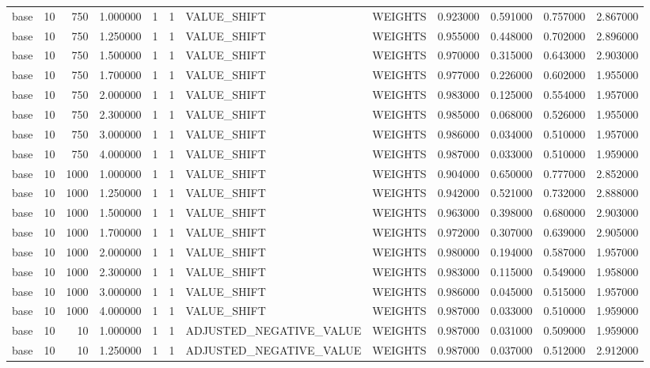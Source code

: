\begin{tabular}{lrrrllllrrrr}
base & 10 & 750 & 1.000000 & 1 & 1 & VALUE_SHIFT & WEIGHTS & 0.923000 & 0.591000 & 0.757000 & 2.867000 \\
base & 10 & 750 & 1.250000 & 1 & 1 & VALUE_SHIFT & WEIGHTS & 0.955000 & 0.448000 & 0.702000 & 2.896000 \\
base & 10 & 750 & 1.500000 & 1 & 1 & VALUE_SHIFT & WEIGHTS & 0.970000 & 0.315000 & 0.643000 & 2.903000 \\
base & 10 & 750 & 1.700000 & 1 & 1 & VALUE_SHIFT & WEIGHTS & 0.977000 & 0.226000 & 0.602000 & 1.955000 \\
base & 10 & 750 & 2.000000 & 1 & 1 & VALUE_SHIFT & WEIGHTS & 0.983000 & 0.125000 & 0.554000 & 1.957000 \\
base & 10 & 750 & 2.300000 & 1 & 1 & VALUE_SHIFT & WEIGHTS & 0.985000 & 0.068000 & 0.526000 & 1.955000 \\
base & 10 & 750 & 3.000000 & 1 & 1 & VALUE_SHIFT & WEIGHTS & 0.986000 & 0.034000 & 0.510000 & 1.957000 \\
base & 10 & 750 & 4.000000 & 1 & 1 & VALUE_SHIFT & WEIGHTS & 0.987000 & 0.033000 & 0.510000 & 1.959000 \\
base & 10 & 1000 & 1.000000 & 1 & 1 & VALUE_SHIFT & WEIGHTS & 0.904000 & 0.650000 & 0.777000 & 2.852000 \\
base & 10 & 1000 & 1.250000 & 1 & 1 & VALUE_SHIFT & WEIGHTS & 0.942000 & 0.521000 & 0.732000 & 2.888000 \\
base & 10 & 1000 & 1.500000 & 1 & 1 & VALUE_SHIFT & WEIGHTS & 0.963000 & 0.398000 & 0.680000 & 2.903000 \\
base & 10 & 1000 & 1.700000 & 1 & 1 & VALUE_SHIFT & WEIGHTS & 0.972000 & 0.307000 & 0.639000 & 2.905000 \\
base & 10 & 1000 & 2.000000 & 1 & 1 & VALUE_SHIFT & WEIGHTS & 0.980000 & 0.194000 & 0.587000 & 1.957000 \\
base & 10 & 1000 & 2.300000 & 1 & 1 & VALUE_SHIFT & WEIGHTS & 0.983000 & 0.115000 & 0.549000 & 1.958000 \\
base & 10 & 1000 & 3.000000 & 1 & 1 & VALUE_SHIFT & WEIGHTS & 0.986000 & 0.045000 & 0.515000 & 1.957000 \\
base & 10 & 1000 & 4.000000 & 1 & 1 & VALUE_SHIFT & WEIGHTS & 0.987000 & 0.033000 & 0.510000 & 1.959000 \\
base & 10 & 10 & 1.000000 & 1 & 1 & ADJUSTED_NEGATIVE_VALUE & WEIGHTS & 0.987000 & 0.031000 & 0.509000 & 1.959000 \\
base & 10 & 10 & 1.250000 & 1 & 1 & ADJUSTED_NEGATIVE_VALUE & WEIGHTS & 0.987000 & 0.037000 & 0.512000 & 2.912000 \\

\end{tabular}
